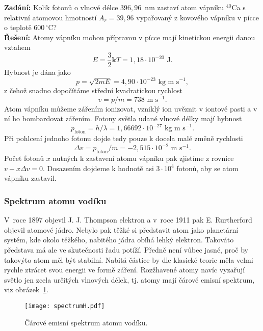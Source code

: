 \begin{priklad}
\textbf{Zadání:} Kolik fotonů o vlnové délce $396{,}96$~nm zastaví atom vápníku $^{40}$Ca s relativní atomovou hmotností $A_r = 39{,}96$ vypařovaný z kovového vápníku v pícce o teplotě $600\,^{\circ}$C?\\[0.1cm]
\textbf{Řešení:} Atomy vápníku mohou přípravou v pícce mají kinetickou energii danou vztahem
\begin{displaymath}
E = \frac{3}{2} \mathbf{k} T = 1{,}18 \cdot 10^{-20} \mbox{ J}.
\end{displaymath}
Hybnost je dána jako
\begin{displaymath}
p = \sqrt{2 m E} = 4{,}90 \cdot 10^{-23} \mbox{ kg m s}^{-1},
\end{displaymath}
z čehož snadno dopočítáme střední kvadratickou rychlost
\begin{displaymath}
v = p/m = 738 \mbox{ m s}^{-1}.
\end{displaymath}
Atom vápníku můžeme zářením ionizovat, vzniklý ion uvěznit v iontové pasti a v ní ho bombardovat zářením. Fotony světla udané vlnové délky mají hybnost
\begin{displaymath}
p_{\mbox{foton}}= h/\lambda = 1{,}66692 \cdot 10^{-27} \mbox{ kg m s}^{-1}.
\end{displaymath}
Při pohlcení jednoho fotonu dojde tedy pouze k docela malé změně rychlosti
\begin{displaymath}
\Delta v = p_{\mbox{foton}}/m = - 2{,}515 \cdot 10^{-2} \mbox{ m s}^{-1}.
\end{displaymath}
Počet fotonů $x$ nutných k zastavení atomu vápníku pak zjistíme z rovnice $v - x \Delta v =0$. Dosazením dojdeme k hodnotě asi $3 \cdot 10^4$ fotonů, aby se atom vápníku zastavil.
\end{priklad}

\subsubsection{Spektrum atomu vodíku}

V~roce 1897 objevil J. J. Thompson elektron a v~roce 1911 pak E. Rurtherford objevil atomové jádro. Nebylo pak těžké si představit atom jako planetární systém, kde okolo těžkého, nabitého jádra obíhá lehký elektron. Takováto představa má ale ve skutečnosti řadu potíží. Předně není vůbec jasné, proč by takovýto atom měl být stabilní. Nabitá částice by dle klasické teorie měla velmi rychle ztrácet svou energii ve formě záření. Rozžhavené atomy navíc vyzařují světlo jen zcela určitých vlnových délek, tj. atomy mají čárové emisní spektrum, viz obrázek~\ref{obr:spectrumH}. 
\begin{figure} [ht]
\centering
\texttt{[image: spectrumH.pdf]}
\caption[Emisní spektrum vodíku]{Čárové emisní spektrum atomu vodíku.}
\label{obr:spectrumH}
\end{figure}

